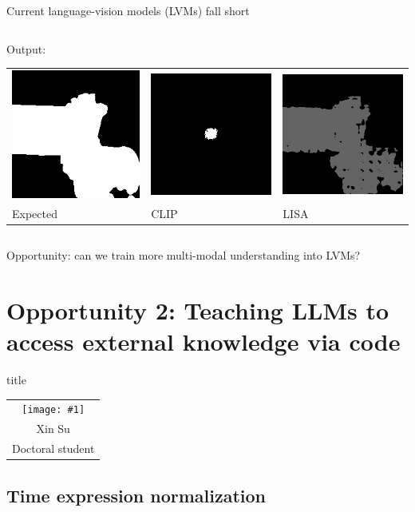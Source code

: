 \documentclass[14pt,aspectratio=169]{beamer}
\newcommand{\headshot}[3]{{\tiny\setlength{\tabcolsep}{0pt}%
\begin{tabular}{c}
\texttt{[image: \#1]} \\
#2 \\
#3
\end{tabular}}}
\newcommand{\sectionbox}{%
\centering
\begin{beamercolorbox}[sep=8pt,center,shadow=true,rounded=true]{title}
  \usebeamerfont{title}\insertsectionhead\par%
\end{beamercolorbox}
\vspace{.2\textheight}}
\begin{document}
\begin{frame}{Current language-vision models (LVMs) fall short}
\begin{columns}
\begin{column}{0.48\textwidth}
\medskip
Output: \\
\begin{tabular}{ l l l @{}}
\includegraphics[width=.25\textwidth]{compgeo/GL024_425_color_output_reference.png}
&
\includegraphics[width=.25\textwidth]{compgeo/GL024_425_color_output_clip.png}
&
\includegraphics[width=.25\textwidth]{compgeo/GL024_425_color_output_lisa.jpg}
\\
Expected & CLIP & LISA
\end{tabular}
\end{column}
\end{columns}
\pause
\bigskip
\alert{Opportunity: can we train more multi-modal understanding into LVMs?}
\end{frame}

\section{Opportunity 2: Teaching LLMs to access external knowledge via code}

\begin{frame}[b]
\sectionbox
\hfill
\headshot{people/su-xin.jpg}{Xin Su}{Doctoral student}
\end{frame}

\subsection{Time expression normalization}
\end{document}
